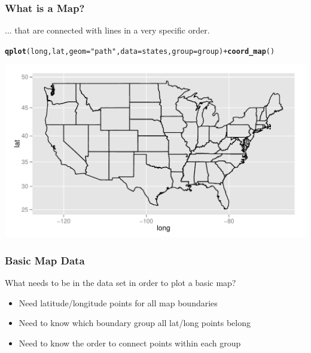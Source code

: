 \documentclass{beamer}\usepackage[]{graphicx}\usepackage[]{color}
\makeatletter
\newcommand{\hlstr}[1]{\textcolor[rgb]{0.192,0.494,0.8}{#1}}%
\newcommand{\hlopt}[1]{\textcolor[rgb]{0,0,0}{#1}}%
\newcommand{\hlstd}[1]{\textcolor[rgb]{0.345,0.345,0.345}{#1}}%
\newcommand{\hlkwc}[1]{\textcolor[rgb]{0.333,0.667,0.333}{#1}}%
\newcommand{\hlkwd}[1]{\textcolor[rgb]{0.737,0.353,0.396}{\textbf{#1}}}%
\newenvironment{kframe}{%
 \def\at@end@of@kframe{}%
 \ifinner\ifhmode%
  \def\at@end@of@kframe{\end{minipage}}%
  \begin{minipage}{\columnwidth}%
 \fi\fi%
 \def\FrameCommand##1{\hskip\@totalleftmargin \hskip-\fboxsep
 \colorbox{shadecolor}{##1}\hskip-\fboxsep
     \hskip-\linewidth \hskip-\@totalleftmargin \hskip\columnwidth}%
 \MakeFramed {\advance\hsize-\width
   \@totalleftmargin\z@ \linewidth\hsize
   \@setminipage}}%
 {\par\unskip\endMakeFramed%
 \at@end@of@kframe}
\newenvironment{knitrout}{}{} %
\makeatother
\begin{document}
\begin{frame}[fragile]
    \frametitle{What is a Map?}

... that are connected with lines in a very specific order.

\small
\begin{knitrout}\footnotesize
{}\color{fgcolor}\begin{kframe}
\begin{alltt}
\hlkwd{qplot}\hlstd{(long, lat,} \hlkwc{geom} \hlstd{=} \hlstr{"path"}\hlstd{,} \hlkwc{data} \hlstd{= states,} \hlkwc{group} \hlstd{= group)} \hlopt{+} \hlkwd{coord_map}\hlstd{()}
\end{alltt}
\end{kframe}
\includegraphics[width=\textwidth]{figure/kmapoutline} 

\end{knitrout}

    \normalsize
\end{frame}



\begin{frame}
    \frametitle{Basic Map Data}
  What needs to be in the data set in order to plot a basic map?
    \begin{itemize}
        \item Need latitude/longitude points for all map boundaries
        \item Need to know which boundary group all lat/long points belong
        \item Need to know the order to connect points within each group
    \end{itemize}    
\end{frame}
\end{document}
